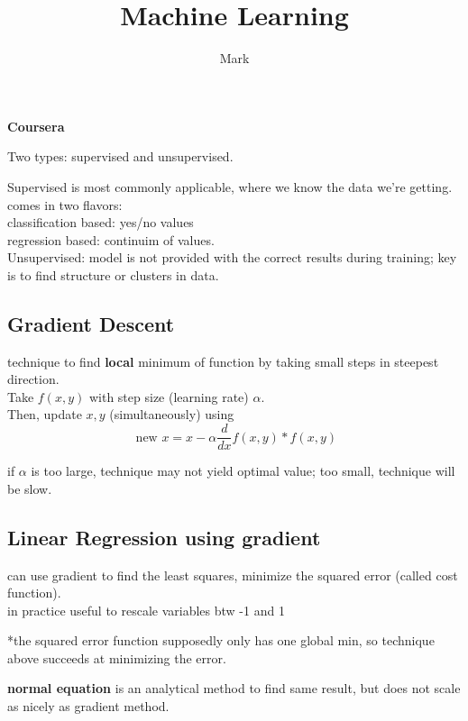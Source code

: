 \documentclass[12pt]{article}
\title{Machine Learning}
\author{Mark}
\date{}
\begin{document}
\maketitle
\centerline{\LARGE \textbf{Coursera}}
\medskip

Two types: supervised and unsupervised.

Supervised is most commonly applicable, where we know the data we're getting.\\
comes in two flavors:\\
classification based: yes/no values\\
regression based: continuim of values.\\

Unsupervised: model is not provided with the correct results during training; key is to find structure or clusters in data.\\

\subsection*{Gradient Descent}

technique to find \textbf{ local } minimum of function by taking small steps in steepest direction.\\
Take $f(x,y)$ with step size (learning rate) $\alpha$. \\ Then,
update $x, y$ (simultaneously) using \\
$$\text{ new } x = x - \alpha \frac{d}{dx} f(x, y) * f(x, y)$$

if $\alpha$ is too large, technique may not yield optimal value; too small, technique will be slow.\\

\subsection*{Linear Regression using gradient}

can use gradient to find the least squares, minimize the squared error (called cost function).\\

in practice useful to rescale variables btw -1 and 1

*the squared error function supposedly only has one global min, so technique above succeeds at minimizing the error.

\textbf{normal equation } is an analytical method to find same result, but does not scale as nicely as gradient method.
\end{document}

